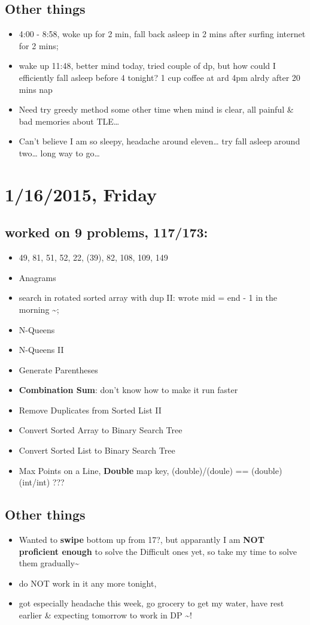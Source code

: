 \documentclass[9pt,b5paper]{article}
\begin{document}
\subsection{Other things}
\label{sec-7-2}
\begin{itemize}
\item 4:00 - 8:58, woke up for 2 min, fall back asleep in 2 mins after surfing internet for 2 mins;
\item wake up 11:48, better mind today, tried couple of dp, but how could I efficiently fall asleep before 4 tonight? 1 cup coffee at ard 4pm alrdy after 20 mins nap
\item Need try greedy method some other time when mind is clear, all painful \& bad memories about TLE\ldots{}
\item Can't believe I am so sleepy, headache around eleven\ldots{} try fall asleep around two\ldots{} long way to go\ldots{}
\end{itemize}
\section{1/16/2015, Friday}
\label{sec-8}
\subsection{worked on 9 problems, 117/173:}
\label{sec-8-1}
\begin{itemize}
\item 49, 81, 51, 52, 22, (39), 82, 108, 109, 149
\item Anagrams
\item search in rotated sorted array with dup II: wrote mid = end - 1 in the morning \textasciitilde{};
\item N-Queens
\item N-Queens II
\item Generate Parentheses
\item \textbf{Combination Sum}: don't know how to make it run faster
\item Remove Duplicates from Sorted List II
\item Convert Sorted Array to Binary Search Tree
\item Convert Sorted List to Binary Search Tree
\item Max Points on a Line, \textbf{Double} map key, (double)/(doule) == (double)(int/int) ???
\end{itemize}
\subsection{Other things}
\label{sec-8-2}
\begin{itemize}
\item Wanted to \textbf{swipe} bottom up from 17?, but apparantly I am \textbf{NOT proficient enough} to solve the Difficult ones yet, so take my time to solve them gradually\textasciitilde{}~
\item do NOT work in it any more tonight,
\item got especially headache this week, go grocery to get my water, have rest earlier \& expecting tomorrow to work in DP \textasciitilde{}!
\end{itemize}
\end{document}
